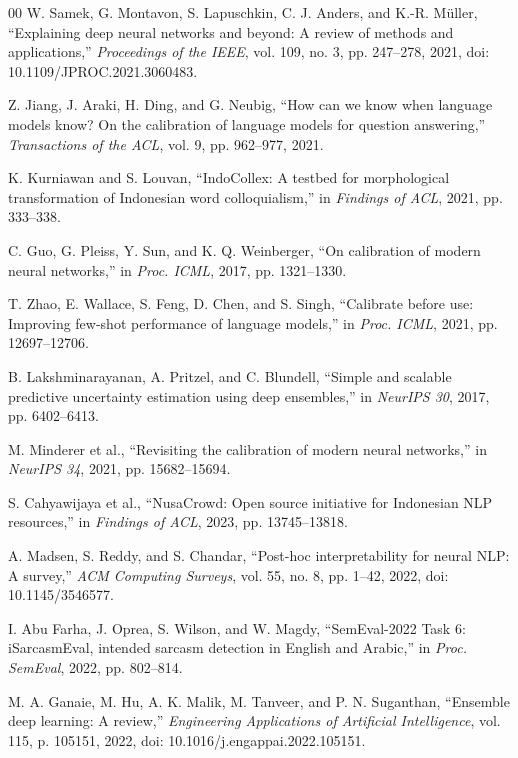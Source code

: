 \documentclass[conference]{IEEEtran}
\begin{document}
\begin{thebibliography}{00}
 W. Samek, G. Montavon, S. Lapuschkin, C. J. Anders, and K.-R. Müller, ``Explaining deep neural networks and beyond: A review of methods and applications,'' \textit{Proceedings of the IEEE}, vol. 109, no. 3, pp. 247--278, 2021, doi: 10.1109/JPROC.2021.3060483.

 Z. Jiang, J. Araki, H. Ding, and G. Neubig, ``How can we know when language models know? On the calibration of language models for question answering,'' \textit{Transactions of the ACL}, vol. 9, pp. 962--977, 2021.

 K. Kurniawan and S. Louvan, ``IndoCollex: A testbed for morphological transformation of Indonesian word colloquialism,'' in \textit{Findings of ACL}, 2021, pp. 333--338.

 C. Guo, G. Pleiss, Y. Sun, and K. Q. Weinberger, ``On calibration of modern neural networks,'' in \textit{Proc. ICML}, 2017, pp. 1321--1330.

 T. Zhao, E. Wallace, S. Feng, D. Chen, and S. Singh, ``Calibrate before use: Improving few-shot performance of language models,'' in \textit{Proc. ICML}, 2021, pp. 12697--12706.

 B. Lakshminarayanan, A. Pritzel, and C. Blundell, ``Simple and scalable predictive uncertainty estimation using deep ensembles,'' in \textit{NeurIPS 30}, 2017, pp. 6402--6413.

 M. Minderer et al., ``Revisiting the calibration of modern neural networks,'' in \textit{NeurIPS 34}, 2021, pp. 15682--15694.

 S. Cahyawijaya et al., ``NusaCrowd: Open source initiative for Indonesian NLP resources,'' in \textit{Findings of ACL}, 2023, pp. 13745--13818.

 A. Madsen, S. Reddy, and S. Chandar, ``Post-hoc interpretability for neural NLP: A survey,'' \textit{ACM Computing Surveys}, vol. 55, no. 8, pp. 1--42, 2022, doi: 10.1145/3546577.

 I. Abu Farha, J. Oprea, S. Wilson, and W. Magdy, ``SemEval-2022 Task 6: iSarcasmEval, intended sarcasm detection in English and Arabic,'' in \textit{Proc. SemEval}, 2022, pp. 802--814.

 M. A. Ganaie, M. Hu, A. K. Malik, M. Tanveer, and P. N. Suganthan, ``Ensemble deep learning: A review,'' \textit{Engineering Applications of Artificial Intelligence}, vol. 115, p. 105151, 2022, doi: 10.1016/j.engappai.2022.105151.


\end{thebibliography}
\end{document}
